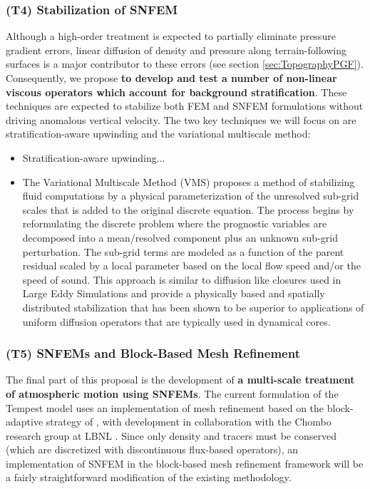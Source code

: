 \documentclass[11pt]{article}
\begin{document}
\subsubsection{(T4) Stabilization of SNFEM}

Although a high-order treatment is expected to partially eliminate pressure gradient errors, linear diffusion of density and pressure along terrain-following surfaces is a major contributor to these errors (see section \ref{sec:TopographyPGF}).  Consequently, we propose \textbf{to develop and test a number of non-linear viscous operators which account for background stratification}.  These techniques are expected to stabilize both FEM and SNFEM formulations without driving anomalous vertical velocity.  The two key techniques we will focus on are stratification-aware upwinding and the variational multiscale method:

\vspace{-0.4cm}
\begin{itemize}
\item Stratification-aware upwinding...

\item The Variational Multiscale Method (VMS) proposes a method of stabilizing fluid computations by a physical parameterization of the unresolved sub-grid scales that is added to the original discrete equation. The process begins by reformulating the discrete problem where the prognostic variables are decomposed into a mean/resolved component plus an unknown sub-grid perturbation.  The sub-grid terms are modeled as a function of the parent residual scaled by a local parameter based on the local flow speed and/or the speed of sound. This approach is similar to diffusion like closures used in Large Eddy Simulations and provide a physically based and spatially distributed stabilization that has been shown to be superior to applications of uniform diffusion operators that are typically used in dynamical cores. \citep{hughes1998variational, marras2012variational, marras2013variational}
\end{itemize}

\subsubsection{(T5) SNFEMs and Block-Based Mesh Refinement}

The final part of this proposal is the development of \textbf{a multi-scale treatment of atmospheric motion using SNFEMs}.  The current formulation of the Tempest model uses an implementation of mesh refinement based on the block-adaptive strategy of \cite{MJBPC1989JCP}, with development in collaboration with the Chombo research group at LBNL \citep{ChomboDesign}.  Since only density and tracers must be conserved (which are discretized with discontinuous flux-based operators), an implementation of SNFEM in the block-based mesh refinement framework will be a fairly straightforward modification of the existing methodology.
\end{document}

